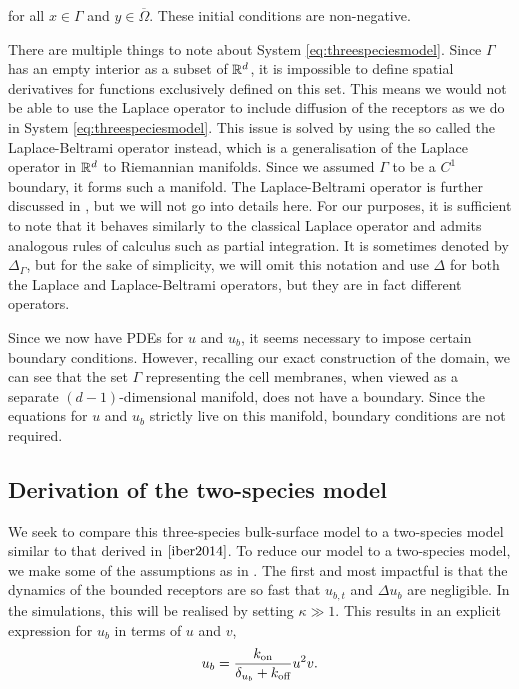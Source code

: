 \noindent
for all $x \in \Gamma$ and $y \in \overline{\Omega}$. These initial conditions are non-negative.

There are multiple things to note about System \eqref{eq:threespeciesmodel}. Since $\Gamma$ has an empty interior as a subset of $\mathbb{R}^d$, it is impossible to define spatial derivatives for functions exclusively defined on this set. This means we would not be able to use the Laplace operator to include diffusion of the receptors as we do in System \eqref{eq:threespeciesmodel}. This issue is solved by using the so called the Laplace-Beltrami operator instead, which is a generalisation of the Laplace operator in $\mathbb{R}^d$ to Riemannian manifolds. Since we assumed $\Gamma$ to be a $C^1$ boundary, it forms such a manifold. The Laplace-Beltrami operator is further discussed in \cite{jost2017riemannian}, but we will not go into details here. For our purposes, it is sufficient to note that it behaves similarly to the classical Laplace operator and admits analogous rules of calculus such as partial integration. It is sometimes denoted by $\Delta_\Gamma$, but for the sake of simplicity, we will omit this notation and use $\Delta$ for both the Laplace and Laplace-Beltrami operators, but they are in fact different operators.

Since we now have PDEs for $u$ and $u_b$, it seems necessary to impose certain boundary conditions. However, recalling our exact construction of the domain, we can see that the set $\Gamma$ representing the cell membranes, when viewed as a separate $(d - 1)$-dimensional manifold, does not have a boundary. Since the equations for $u$ and $u_b$ strictly live on this manifold, boundary conditions are not required.

\subsection{Derivation of the two-species model}

We seek to compare this three-species bulk-surface model to a two-species model similar to that derived in $\cite{iber2014}$. To reduce our model to a two-species model, we make some of the assumptions as in \cite{iber2014}. The first and most impactful is that the dynamics of the bounded receptors are so fast that $u_{b, t}$ and $\Delta u_b$ are negligible. In the simulations, this will be realised by setting $\kappa \gg 1$. This results in an explicit expression for $u_b$ in terms of $u$ and $v$,
%
\begin{equation*}
    u_b = \frac{k_\text{on}}{\delta_{u_b} + k_\text{off}} u^2 v .
\end{equation*}

